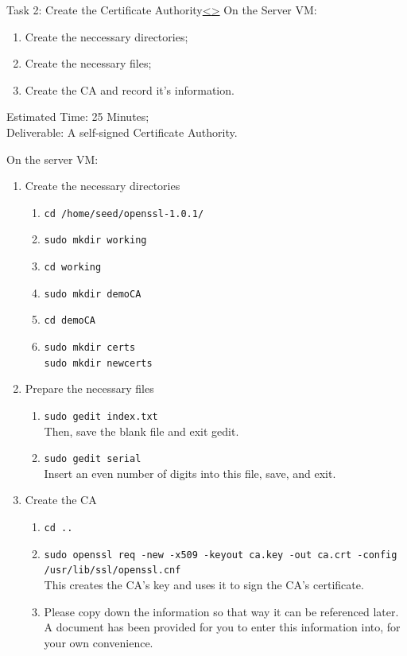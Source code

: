 \documentclass[12pt]{extarticle}
\newenvironment{instructionblock}{\Large\bgroup}{\egroup}
\newcommand{\ben}{\begin{enumerate}}
\newcommand{\een}{\end{enumerate}}
\begin{document}

\pagebreak
\begin{slide}{Task 2: Create the Certificate Authority}{\hyperref[slide 8]{\textless}\hyperref[slide 10]{\textgreater}}
	\begin{instructionblock}
		On the Server VM:
		\ben
			\item Create the neccessary directories;
			\item Create the necessary files;
			\item Create the CA and record it's information.
		\een
	\end{instructionblock}
\end{slide} 
\noindent
Estimated Time: 25 Minutes; \\
Deliverable: A self-signed Certificate Authority.\\

\vspace*{2mm}

\noindent
On the server VM:
\ben
	\item Create the necessary directories 
		\ben
			\item \texttt{cd /home/seed/openssl-1.0.1/}
			\item \texttt{sudo mkdir working}
			\item \texttt{cd working}
			\item \texttt{sudo mkdir demoCA}
			\item \texttt{cd demoCA}
			\item \texttt{sudo mkdir certs} \\ \texttt{sudo mkdir newcerts}
		\een
	\item Prepare the necessary files
		\ben
			\item \texttt{sudo gedit index.txt} \\ Then, save the blank file and exit gedit.
			\item \texttt{sudo gedit serial} \\ Insert an even number of digits into this file, save, and exit.
		\een
	\item Create the CA
		\ben
			\item \texttt{cd ..}
			\item \texttt{sudo openssl req -new -x509 -keyout ca.key -out ca.crt -config /usr/lib/ssl/openssl.cnf} \\ This creates the CA's key and uses it to sign the CA's certificate.
			\item Please copy down the information so that way it can be referenced later. A document has been provided for you to enter this information into, for your own convenience.
		\een
\een
\end{document}
